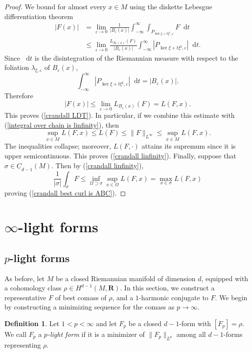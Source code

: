 \documentclass[reqno,11pt]{amsart}
\newcommand{\RR}{\mathbf{R}}
\newcommand*\dif{\mathop{}\!\mathrm{d}}
\newcommand{\Chain}{\underline C}
\newcommand{\dfn}[1]{\emph{#1}\index{#1}}
\theoremstyle{definition}
\newtheorem{definition}[theorem]{Definition}
\numberwithin{equation}{section}
\begin{document}
\begin{proof}
We bound for almost every $x \in M$ using the diskette Lebesgue differentiation theorem
\begin{align*}
|F(x)|
&= \lim_{\varepsilon \to 0} \frac{1}{|B_\varepsilon(x)|} \int_{-\infty}^\infty \int_{P_{\ker \xi + t\xi^\sharp, \varepsilon}} F \dif t \\
&\leq \lim_{\varepsilon \to 0} \frac{L_{B_\varepsilon(x)}(F)}{|B_\varepsilon(x)|} \int_{-\infty}^\infty |P_{\ker \xi + t\xi^\sharp, \varepsilon}| \dif t.
\end{align*}
Since $\dif t$ is the disintegration of the Riemannian measure with respect to the foliation $\lambda_{\xi, \varepsilon}$ of $B_\varepsilon(x)$,
$$\int_{-\infty}^\infty |P_{\ker \xi + t\xi^\sharp, \varepsilon}| \dif t = |B_\varepsilon(x)|.$$
Therefore
$$|F(x)| \leq \lim_{\varepsilon \to 0} L_{B_\varepsilon(x)}(F) = L(F, x).$$
This proves (\ref{crandall LDT}). In particular, if we combine this estimate with (\ref{integral over chain is linfinity}), then
$$\sup_{x \in M} L(F, x) \leq L(F) \leq \|F\|_{L^\infty} \leq \sup_{x \in M} L(F, x).$$
The inequalities collapse; moreover, $L(F, \cdot)$ attains its supremum since it is upper semicontinuous.
This proves (\ref{crandall linfinity}).
Finally, suppose that $\sigma \in \Chain_{d - 1}(M)$. Then by (\ref{crandall linfinity}),
$$\frac{1}{|\sigma|} \int_\sigma F \leq \inf_{\Omega \supset \sigma} \sup_{x \in \Omega} L(F, x) = \max_{x \in \sigma} L(F, x)$$
proving (\ref{crandall best curl is ABC}).
\end{proof}


\section{\texorpdfstring{$\infty$-light forms}{Infinity-light forms}}
\subsection{\texorpdfstring{$p$-light forms}{p-light forms}}
As before, let $M$ be a closed Riemannian manifold of dimension $d$, equipped with a cohomology class $\rho \in H^{d - 1}(M, \RR)$.
In this section, we construct a representative $F$ of best comass of $\rho$, and a $1$-harmonic conjugate to $F$.
We begin by constructing a minimizing sequence for the comass as $p \to \infty$.

\begin{definition}
Let $1 < p < \infty$ and let $F_p$ be a closed $d - 1$-form with $[F_p] = \rho$.
We call $F_p$ a \dfn{$p$-light form} if it is a minimizer of $\|F_p\|_{L^p}$ among all $d - 1$-forms representing $\rho$.
\end{definition}
\end{document}
